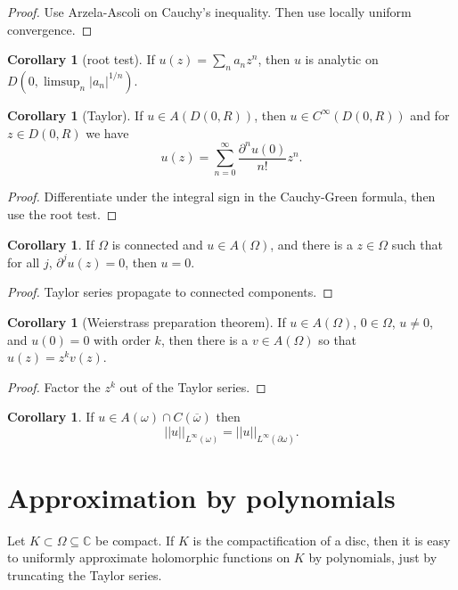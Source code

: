 \documentclass[12pt]{report}
\newcommand{\CC}{\mathbb{C}}
\theoremstyle{definition}
\newtheorem{corollary}[theorem]{Corollary}
\begin{document}
\begin{proof}
    Use Arzela-Ascoli on Cauchy's inequality. Then use locally uniform convergence.
\end{proof}
\begin{corollary}[root test]
    If $u(z) = \sum_n a_nz^n$, then $u$ is analytic on $D(0, \limsup_n |a_n|^{1/n})$.
\end{corollary}
\begin{corollary}[Taylor]
    If $u \in A(D(0, R))$, then $u \in C^\infty(D(0, R))$ and for $z \in D(0, R)$ we have
    $$u(z) = \sum_{n=0}^\infty \frac{\partial^n u(0)}{n!} z^n.$$
\end{corollary}
\begin{proof}
    Differentiate under the integral sign in the Cauchy-Green formula, then use the root test.
\end{proof}
\begin{corollary}
    If $\Omega$ is connected and $u \in A(\Omega)$, and there is a $z \in \Omega$ such that for all $j$, $\partial^ju(z) = 0$, then $u = 0$.
\end{corollary}
\begin{proof}
    Taylor series propagate to connected components.
\end{proof}
\begin{corollary}[Weierstrass preparation theorem]
    If $u \in A(\Omega)$, $0 \in \Omega$, $u \neq 0$, and $u(0) = 0$ with order $k$, then there is a $v \in A(\Omega)$ so that $u(z) = z^k v(z)$.
\end{corollary}
\begin{proof}
    Factor the $z^k$ out of the Taylor series.
\end{proof}
\begin{corollary}
    If $u \in A(\omega) \cap C(\overline \omega)$ then
    $$||u||_{L^\infty(\omega)} = ||u||_{L^\infty(\partial \omega)}.$$
\end{corollary}

\section{Approximation by polynomials}
Let $K \subset \Omega \subseteq \CC$ be compact. If $K$ is the compactification of a disc, then it is easy to uniformly approximate holomorphic functions on $K$ by polynomials, just by truncating the Taylor series.
\end{document}

